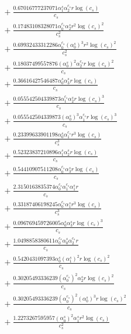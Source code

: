 \documentclass[10pt]{article}
\begin{document}
\begin{align*}
&{}  + \frac{0.67016777237071 \alpha_{1}^s \alpha_{2}^{c_s} r \log{\left(c_{s} \right)}}{c_{s}} \\
&{}  + \frac{0.17483108328071 \alpha_{0}^{c_s} \alpha_{2}^s r^{2} \log{\left(c_{s} \right)}^{2}}{c_{s}^{2}} \\
&{}  + \frac{0.69932433312286 \alpha_{0}^{c_s} \left(\alpha_{0}^s\right)^{3} r^{2} \log{\left(c_{s} \right)}^{2}}{c_{s}^{2}} \\
&{}  + \frac{0.18037499557876 \left(\alpha_{0}^s\right)^{2} \alpha_{2}^{c_s} r \log{\left(c_{s} \right)}^{2}}{c_{s}} \\
&{}  + \frac{0.36616427546487 \alpha_{0}^s \alpha_{3}^s r \log{\left(c_{s} \right)}}{c_{s}} \\
&{}  + \frac{0.055542504339873 \alpha_{1}^{c_s} \alpha_{2}^s r \log{\left(c_{s} \right)}^{3}}{c_{s}} \\
&{}  + \frac{0.055542504339873 \left(\alpha_{0}^s\right)^{3} \alpha_{1}^{c_s} r \log{\left(c_{s} \right)}^{3}}{c_{s}} \\
&{}  + \frac{0.23399633901198 \alpha_{0}^s \alpha_{1}^{c_s} r^{3} \log{\left(c_{s} \right)}}{c_{s}^{3}} \\
&{}  + \frac{0.52323837210896 \alpha_{1}^s \alpha_{2}^s r \log{\left(c_{s} \right)}}{c_{s}} \\
&{}  + \frac{0.54410907511208 \alpha_{0}^{c_s} \alpha_{3}^s r \log{\left(c_{s} \right)}}{c_{s}} \\
&{}  + \frac{2.3150163835374 \alpha_{0}^{c_s} \alpha_{1}^{c_s} \alpha_{1}^s r}{c_{s}} \\
&{}  + \frac{0.33187406198245 \alpha_{0}^{c_s} \alpha_{1}^s r^{3} \log{\left(c_{s} \right)}}{c_{s}^{3}} \\
&{}  + \frac{0.096769459726005 \alpha_{0}^s \alpha_{3}^s r \log{\left(c_{s} \right)}^{3}}{c_{s}} \\
&{}  + \frac{1.0498858380611 \alpha_{0}^{c_s} \alpha_{0}^s \alpha_{2}^{c_s} r}{c_{s}} \\
&{}  + \frac{0.5420431097393 \alpha_{0}^s \left(\alpha_{1}^s\right)^{2} r \log{\left(c_{s} \right)}^{2}}{c_{s}} \\
&{}  + \frac{0.30205493336239 \left(\alpha_{0}^{c_s}\right)^{2} \alpha_{2}^s r \log{\left(c_{s} \right)}^{2}}{c_{s}} \\
&{}  + \frac{0.30205493336239 \left(\alpha_{0}^{c_s}\right)^{2} \left(\alpha_{0}^s\right)^{3} r \log{\left(c_{s} \right)}^{2}}{c_{s}} \\
&{}  + \frac{1.2273267595957 \left(\alpha_{0}^s\right)^{2} \alpha_{1}^s r^{2} \log{\left(c_{s} \right)}}{c_{s}^{2}} \\

\end{align*}
\end{document}
